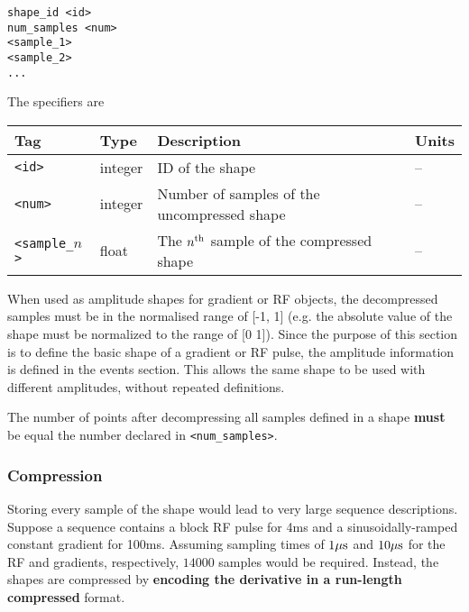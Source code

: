 \documentclass{article}
\begin{document}
\begin{lstlisting}
shape_id <id>
num_samples <num>
<sample_1>
<sample_2>
...
\end{lstlisting}

The specifiers are

\begin{tabularx}{\textwidth}{llXl}
\toprule
Tag & Type & Description & Units\\
\midrule
\verb.<id>. & integer & ID of the shape & -- \\
\verb.<num>. & integer & Number of samples of the uncompressed shape & -- \\
\verb.<sample_.$n$\verb.>. & float & The $n^{\rm th}$ sample of the compressed shape  & -- \\
\bottomrule
\end{tabularx}

When used as amplitude shapes for gradient or RF objects, the decompressed samples must be in the normalised range of [-1, 1] (e.g. the absolute value of the shape must be normalized to the range of [0 1]). Since the purpose of this section is to define the basic shape of a gradient or RF pulse, the amplitude information is defined in the events section. This allows the same shape to be used with different amplitudes, without repeated definitions.

The number of points after decompressing all samples defined in a shape \textbf{must} be equal the number declared in \verb.<num_samples>..

\subsubsection{Compression}

Storing every sample of the shape would lead to very large sequence descriptions. Suppose a sequence contains a block RF pulse for 4ms and a sinusoidally-ramped constant gradient for 100ms. Assuming sampling times of $1{\rm \mu s}$ and $10{\rm \mu s}$ for the RF and gradients, respectively, $14000$ samples would be required. Instead, the shapes are compressed by \textbf{encoding the derivative in a run-length compressed} format. 
\end{document}
